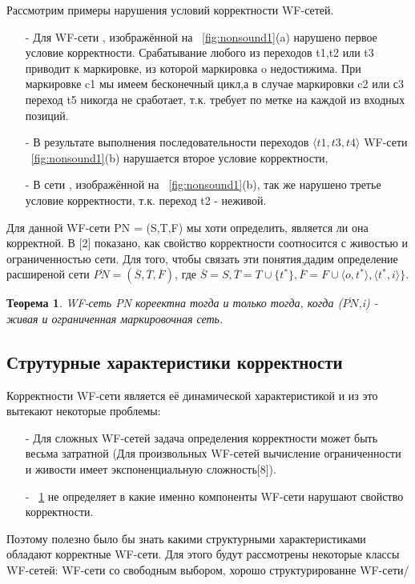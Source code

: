 \documentclass[a4paper,14pt]{article}
\newtheorem{theorem}{Теорема}
\begin{document}
Рассмотрим примеры нарушения условий корректности WF-сетей.
\begin{enumerate}
  \item[-] Для WF-сети , изображённой на ~\cref{fig:nonsound1}(a) нарушено первое условие корректности. Срабатывание любого  из переходов t1,t2 или t3 приводит к маркировке, из которой маркировка o недостижима. При маркировке c1 мы имеем бесконечный цикл,а в случае маркировки c2 или с3 переход t5 никогда не сработает, т.к. требует по метке на каждой из входных позиций.
  \item[-] В результате выполнения последовательности переходов $\langle t1, t3,t4 \rangle$ WF-сети ~\cref{fig:nonsound1}(b) нарушается второе условие корректности, 
  \item[-] В сети , изображённой на ~\cref{fig:nonsound1}(b), так же нарушено третье условие корректности, т.к. переход t2 - неживой.
\end{enumerate}


Для данной WF-сети PN = (S,T,F) мы хоти определить, является ли она корректной. В [2] показано, как свойство корректности соотносится с живостью и ограниченностью сети. Для того, чтобы связать эти понятия,дадим определение расширеной сети $\overline{PN}= (\overline{S},\overline{T},\overline{F})$, где $
	\overline{S} =S, \overline{T} = T \cup \lbrace t^{*} \rbrace, \overline{F} = F \cup \langle o, t^{*} \rangle, \langle t^{*}, i \rangle \rbrace
$.


\begin{theorem}\label{thm:soundness}
WF-сеть PN кореектна тогда и только тогда, когда ($\overline{PN}$,i) - живая и ограниченная маркировочная сеть.
\end{theorem}

\subsection{Струтурные характеристики корректности}
Корректности WF-сети является её динамической характеристикой и из это вытекают некоторые проблемы:
\begin{enumerate}
	\item[-] Для сложных WF-сетей задача определения корректности может быть весьма затратной (Для произвольных WF-сетей вычисление ограниченности и живости имеет экспоненциальную сложность[8]).
	\item[-] ~\cref{thm:soundness} не определяет в какие именно компоненты WF-сети нарушают свойство корректности.
\end{enumerate} 
Поэтому полезно было бы знать какими структурными характеристиками обладают корректные WF-сети. Для этого будут рассмотрены некоторые классы WF-сетей: WF-сети со свободным выбором, хорошо структурированне WF-сети/
\end{document}
